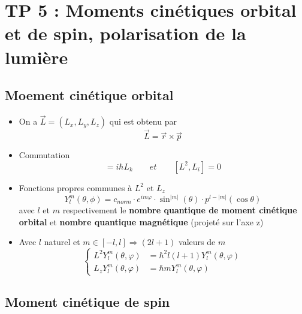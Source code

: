 
\section*{TP 5 : Moments cinétiques orbital et de spin, polarisation de la lumière}

\subsection*{Moement cinétique orbital}
\begin{itemize}
	\item On a $\vec{L} = (L_x,L_y,L_z)$ qui est obtenu par
		\begin{equation}
			\vec{L} = \vec{r} \times \vec{p}
		\end{equation}
		
	\item Commutation
		\begin{equation}
			[L_i,L_j] = i\hbar L_k \qquad et \qquad[L^2,L_i] = 0
		\end{equation}
	
	\item Fonctions propres communes à $L^2$ et $L_z$
		\begin{equation}
			Y^m_l (\theta , \phi ) = c_{norm} \cdot e^{im \varphi } \cdot \sin ^{|m|}(\theta ) \cdot p^{l-|m|}(\cos \theta )
		\end{equation}
		avec $l$ et $m$ respectivement le \textbf{nombre quantique de moment cinétique orbital} et \textbf{nombre quantique magnétique} (projeté sur l'axe z)
		
		\item Avec $l$ naturel et $m \in [-l,l] \Rightarrow (2l+1)$ valeurs de $m$
		\begin{equation}
			\left\{
			\begin{aligned}
			L^2 Y^m_l (\theta , \varphi ) &= \hbar ^2 l(l+1) Y^m_l (\theta , \varphi )\\
			L_z Y^m_l (\theta , \varphi ) &= \hbar m Y^m_l (\theta , \varphi )
			\end{aligned}
			\right.
		\end{equation}
\end{itemize}

\subsection*{Moment cinétique de spin}

